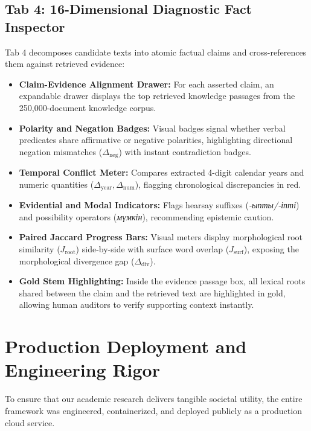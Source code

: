\subsection{Tab 4: 16-Dimensional Diagnostic Fact Inspector}
Tab 4 decomposes candidate texts into atomic factual claims and cross-references them against retrieved evidence:
\begin{itemize}
    \item \textbf{Claim-Evidence Alignment Drawer:} For each asserted claim, an expandable drawer displays the top retrieved knowledge passages from the 250,000-document knowledge corpus.
    \item \textbf{Polarity and Negation Badges:} Visual badges signal whether verbal predicates share affirmative or negative polarities, highlighting directional negation mismatches ($\Delta_{\text{neg}}$) with instant contradiction badges.
    \item \textbf{Temporal Conflict Meter:} Compares extracted 4-digit calendar years and numeric quantities ($\Delta_{\text{year}}, \Delta_{\text{num}}$), flagging chronological discrepancies in red.
    \item \textbf{Evidential and Modal Indicators:} Flags hearsay suffixes (\textit{-ыпты/-іпті}) and possibility operators (\textit{мүмкін}), recommending epistemic caution.
    \item \textbf{Paired Jaccard Progress Bars:} Visual meters display morphological root similarity ($J_{\text{root}}$) side-by-side with surface word overlap ($J_{\text{surf}}$), exposing the morphological divergence gap ($\Delta_{\text{div}}$).
    \item \textbf{Gold Stem Highlighting:} Inside the evidence passage box, all lexical roots shared between the claim and the retrieved text are highlighted in gold, allowing human auditors to verify supporting context instantly.
\end{itemize}

\section{Production Deployment and Engineering Rigor}
\label{sec:production_deployment}

To ensure that our academic research delivers tangible societal utility, the entire framework was engineered, containerized, and deployed publicly as a production cloud service.

